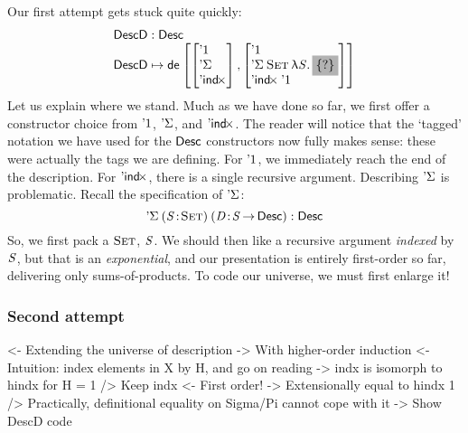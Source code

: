 Our first attempt gets stuck quite quickly:
%
\[\stk{
\DescD : \Desc \\
\DescD \mapsto
  \tada{\stkm{\DUnit\\ \SYMBDSigma\\ \SYMBDIndx}}
       {\stkm{ \DUnit                                \\
         \DSigma{\Set}{\LAM{\V{S}} \SHED}      \\
         \DIndx{\DUnit}    }                    } \\
}\]
%
Let us explain where we stand. Much as
we have done so far, we first offer a constructor choice from
$\DUnit$, $\SYMBDSigma$, and $\SYMBDIndx$. The reader will notice
that the `tagged' notation we have used for the $\Desc$ constructors now
fully makes sense: these were actually the tags we are defining.
For $\DUnit$, we immediately reach the end of the description. For
$\SYMBDIndx$, there is a single recursive argument. Describing
$\SYMBDSigma$ is problematic. Recall the specification of
$\SYMBDSigma$:
%
\[
\DSigma{(\Bhab{\V{S}}{\Set})}{(\Bhab{\V{D}}{\V{S} \To \Desc})} : \Desc\\
\]
%
So, we first pack a  $\Set$, $\V{S}$. We should then like
a recursive argument \emph{indexed} by $\V{S}$, but
that is an \emph{exponential}, and our presentation is entirely
first-order so far, delivering only sums-of-products. To code our
universe, we must first enlarge it!


\subsubsection{Second attempt}

\begin{wstructure}
<- Extending the universe of description
    -> With higher-order induction
    <- Intuition: index elements in X by H, and go on reading
        -> indx is isomorph to hindx for H = 1
    /> Keep indx
        <- First order!
        -> Extensionally equal to hindx 1
        /> Practically, definitional equality on Sigma/Pi cannot cope with it
    -> Show DescD code
\end{wstructure}

